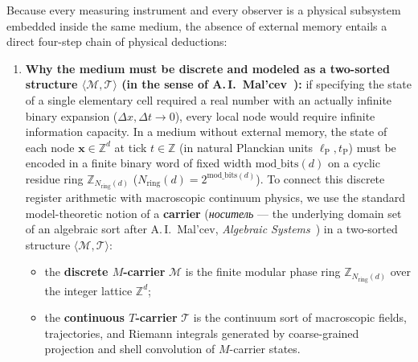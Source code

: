 \documentclass[11pt,a4paper]{article}
\theoremstyle{plain}
\theoremstyle{definition}
\begin{document}
Because every measuring instrument and every observer is a physical subsystem embedded inside the same medium, the absence of external memory entails a direct four-step chain of physical deductions:
\begin{enumerate}[label=\textbf{Step \arabic*.},leftmargin=*]
\item \textbf{Why the medium must be discrete and modeled as a two-sorted structure $\langle\mathcal{M},\mathcal{T}\rangle$ (in the sense of A.\,I.~Mal'cev~\cite{Malcev1973}):}
  if specifying the state of a single elementary cell required a real number with an actually infinite binary expansion ($\Delta x,\Delta t\to 0$), every local node would require infinite information capacity. In a medium without external memory, the state of each node $\mathbf{x}\in\mathbb{Z}^d$ at tick $t\in\mathbb{Z}$ (in natural Planckian units $\ell_{\mathrm{P}}, t_{\mathrm{P}}$) must be encoded in a finite binary word of fixed width $\mathrm{mod\_bits}(d)$ on a cyclic residue ring $\mathbb{Z}_{N_{\mathrm{ring}}(d)}$ ($N_{\mathrm{ring}}(d) = 2^{\mathrm{mod\_bits}(d)}$). To connect this discrete register arithmetic with macroscopic continuum physics, we use the standard model-theoretic notion of a \textbf{carrier} (\emph{носитель} --- the underlying domain set of an algebraic sort after A.\,I.~Mal'cev, \emph{Algebraic Systems}~\cite{Malcev1973}) in a two-sorted structure $\langle\mathcal{M},\mathcal{T}\rangle$:
  \begin{itemize}[noitemsep]
  \item the \textbf{discrete $M$-carrier} $\mathcal{M}$ is the finite modular phase ring $\mathbb{Z}_{N_{\mathrm{ring}}(d)}$ over the integer lattice $\mathbb{Z}^d$;
  \item the \textbf{continuous $T$-carrier} $\mathcal{T}$ is the continuum sort of macroscopic fields, trajectories, and Riemann integrals generated by coarse-grained projection and shell convolution of $M$-carrier states.
  \end{itemize}


\end{enumerate}
\end{document}
